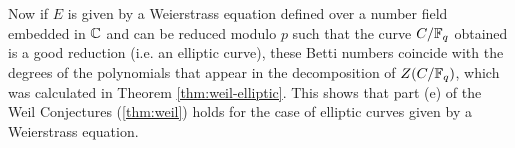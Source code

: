 Now if $E$ is given by a Weierstrass equation
defined over a number field embedded
in $\mathbb{C}$ and can be reduced modulo $p$ such that the curve
$C/\mathbb{F}_q$ obtained is a good reduction (i.e. an elliptic curve),
these Betti numbers coincide with
the degrees of the polynomials that appear in the decomposition of
$Z(C/\mathbb{F}_q)$, which was calculated in Theorem \ref{thm:weil-elliptic}.
This shows that part (e) of the Weil Conjectures
(\ref{thm:weil}) holds for the case of elliptic curves given by a Weierstrass
equation.
